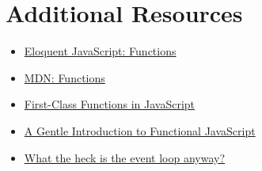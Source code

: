 

\section{Additional Resources}

\begin{itemize}[leftmargin=*]
    \item \href{https://eloquentjavascript.net/03_functions.html}{Eloquent JavaScript: Functions}
    \item \href{https://developer.mozilla.org/en-US/docs/Web/JavaScript/Reference/Functions}{MDN: Functions}
    \item \href{https://nick.scialli.me/first-class-functions-in-javascript/}{First-Class Functions in JavaScript}
    \item \href{https://jrsinclair.com/articles/2016/gentle-introduction-to-functional-javascript-intro/}{A Gentle Introduction to Functional JavaScript}
    \item \href{https://www.youtube.com/watch?v=8aGhZQkoFbQ}{What the heck is the event loop anyway?}
\end{itemize}
